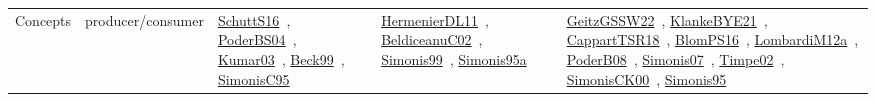 {\begin{longtable}{lp{3cm}>{\raggedright\arraybackslash}p{6cm}>{\raggedright\arraybackslash}p{6cm}>{\raggedright\arraybackslash}p{8cm}}
Concepts & producer/consumer & \href{works/SchuttS16.pdf}{SchuttS16}~\cite{SchuttS16}, \href{works/PoderBS04.pdf}{PoderBS04}~\cite{PoderBS04}, \href{works/Kumar03.pdf}{Kumar03}~\cite{Kumar03}, \href{works/Beck99.pdf}{Beck99}~\cite{Beck99}, \href{works/SimonisC95.pdf}{SimonisC95}~\cite{SimonisC95} & \href{works/HermenierDL11.pdf}{HermenierDL11}~\cite{HermenierDL11}, \href{works/BeldiceanuC02.pdf}{BeldiceanuC02}~\cite{BeldiceanuC02}, \href{works/Simonis99.pdf}{Simonis99}~\cite{Simonis99}, \href{works/Simonis95a.pdf}{Simonis95a}~\cite{Simonis95a} & \href{works/GeitzGSSW22.pdf}{GeitzGSSW22}~\cite{GeitzGSSW22}, \href{works/KlankeBYE21.pdf}{KlankeBYE21}~\cite{KlankeBYE21}, \href{works/CappartTSR18.pdf}{CappartTSR18}~\cite{CappartTSR18}, \href{works/BlomPS16.pdf}{BlomPS16}~\cite{BlomPS16}, \href{works/LombardiM12a.pdf}{LombardiM12a}~\cite{LombardiM12a}, \href{works/PoderB08.pdf}{PoderB08}~\cite{PoderB08}, \href{works/Simonis07.pdf}{Simonis07}~\cite{Simonis07}, \href{works/Timpe02.pdf}{Timpe02}~\cite{Timpe02}, \href{works/SimonisCK00.pdf}{SimonisCK00}~\cite{SimonisCK00}, \href{works/Simonis95.pdf}{Simonis95}~\cite{Simonis95}\\

\end{longtable}}
